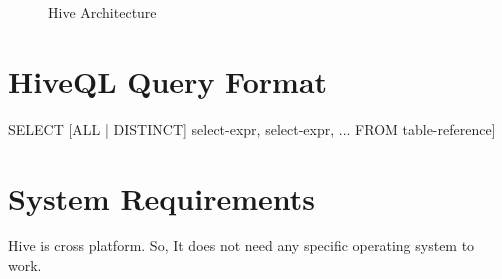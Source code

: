 \documentclass[9pt,twocolumn,twoside]{../../styles/osajnl}
\begin{document}
\begin{figure}[htbp]
	\centering
	\caption{Hive Architecture}
	\label{fig:Hive-arch}
\end{figure}

\section{HiveQL Query Format}
SELECT [ALL | DISTINCT] select-expr, select-expr, ...\newline
FROM table-reference\newline
[CLUSTER BY col-list | [DISTRIBUTE BY col-list] [SORT BY col-list]]\newline
\cite{p1}\newline

\section{System Requirements}
Hive is cross platform. So, It does not need any specific operating system to work.
\end{document}
